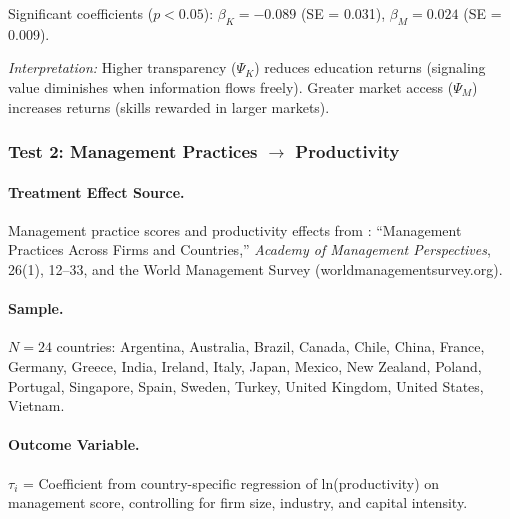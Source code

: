 \documentclass[12pt,a4paper]{article}
\begin{document}
Significant coefficients ($p < 0.05$): $\beta_K = -0.089$ (SE = 0.031), $\beta_M = 0.024$ (SE = 0.009).

\textit{Interpretation:} Higher transparency ($\Psi_K$) reduces education returns (signaling value diminishes when information flows freely). Greater market access ($\Psi_M$) increases returns (skills rewarded in larger markets).

\subsubsection{Test 2: Management Practices $\rightarrow$ Productivity}

\paragraph{Treatment Effect Source.}
Management practice scores and productivity effects from \citet{bloom2012management}: ``Management Practices Across Firms and Countries,'' \textit{Academy of Management Perspectives}, 26(1), 12--33, and the World Management Survey (worldmanagementsurvey.org).

\paragraph{Sample.}
$N = 24$ countries: Argentina, Australia, Brazil, Canada, Chile, China, France, Germany, Greece, India, Ireland, Italy, Japan, Mexico, New Zealand, Poland, Portugal, Singapore, Spain, Sweden, Turkey, United Kingdom, United States, Vietnam.

\paragraph{Outcome Variable.}
$\tau_i$ = Coefficient from country-specific regression of ln(productivity) on management score, controlling for firm size, industry, and capital intensity.
\end{document}
